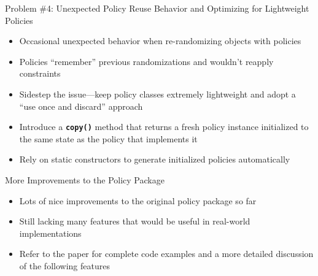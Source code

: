 \documentclass[aspectratio=169]{beamer}
\newcommand{\code}[1]{
  \textbf{\texttt{#1}}
}
\begin{document}
\begin{frame}{\LARGE{Problem \#4: Unexpected Policy Reuse Behavior and Optimizing for Lightweight Policies}}
  \begin{itemize}
    \setlength\itemsep{1em}
    \item Occasional unexpected behavior when re-randomizing objects with policies
    \item Policies ``remember'' previous randomizations and wouldn't reapply constraints
    \item Sidestep the issue---keep policy classes extremely lightweight and adopt a ``use once and discard'' approach
    \item Introduce a \code{copy()} method that returns a fresh policy instance initialized to the same state as the policy that implements it
    \item Rely on static constructors to generate initialized policies automatically
  \end{itemize}
\end{frame}

\begin{frame}
\end{frame}

\begin{frame}{More Improvements to the Policy Package}
  \begin{itemize}
    \setlength\itemsep{1em}
    \item Lots of nice improvements to the original policy package so far
    \item Still lacking many features that would be useful in real-world implementations
    \item Refer to the paper for complete code examples and a more detailed discussion of the following features
  \end{itemize}
\end{frame}
\end{document}
